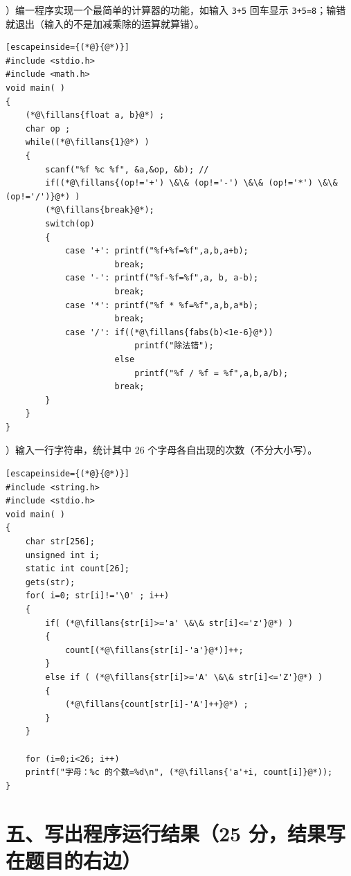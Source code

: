 \documentclass[UTF8,a4paper,10.5pt]{ctexart}
\newcommand{\fillans}[1]{\underline{\textbf{\ #1\ }}}
\begin{document}
）编一程序实现一个最简单的计算器的功能，如输入 \texttt{3+5} 回车显示 \texttt{3+5=8}；输错就退出（输入的不是加减乘除的运算就算错）。
\begin{lstlisting}[escapeinside={(*@}{@*)}]
#include <stdio.h>
#include <math.h>
void main( )
{
    (*@\fillans{float a, b}@*) ;
    char op ;
    while((*@\fillans{1}@*) )
    {
        scanf("%f %c %f", &a,&op, &b); //
        if((*@\fillans{(op!='+') \&\& (op!='-') \&\& (op!='*') \&\& (op!='/')}@*) )
        (*@\fillans{break}@*);
        switch(op)
        {
            case '+': printf("%f+%f=%f",a,b,a+b);
                      break;
            case '-': printf("%f-%f=%f",a, b, a-b);
                      break;
            case '*': printf("%f * %f=%f",a,b,a*b);
                      break;
            case '/': if((*@\fillans{fabs(b)<1e-6}@*))
                          printf("除法错");
                      else
                          printf("%f / %f = %f",a,b,a/b);
                      break;
        }
    }
}
\end{lstlisting}

\medskip
{}）输入一行字符串，统计其中 26 个字母各自出现的次数（不分大小写）。
\begin{lstlisting}[escapeinside={(*@}{@*)}]
#include <string.h>
#include <stdio.h>
void main( )
{
    char str[256];
    unsigned int i;
    static int count[26];
    gets(str);
    for( i=0; str[i]!='\0' ; i++)
    {
        if( (*@\fillans{str[i]>='a' \&\& str[i]<='z'}@*) )
        {
            count[(*@\fillans{str[i]-'a'}@*)]++;
        }
        else if ( (*@\fillans{str[i]>='A' \&\& str[i]<='Z'}@*) )
        {
            (*@\fillans{count[str[i]-'A']++}@*) ;
        }
    }

    for (i=0;i<26; i++)
    printf("字母：%c 的个数=%d\n", (*@\fillans{'a'+i, count[i]}@*));
}
\end{lstlisting}

\section*{五、写出程序运行结果（25 分，结果写在题目的右边）}
\end{document}
